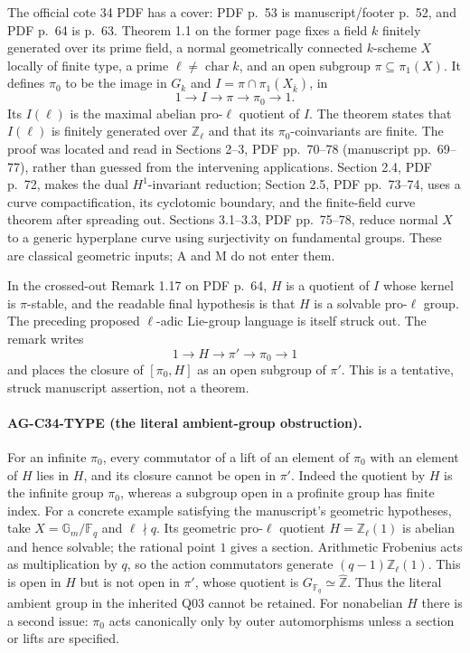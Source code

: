 The official cote 34 PDF has a cover: PDF p.~53 is manuscript/footer
p.~52, and PDF p.~64 is p.~63. Theorem 1.1 on the former page fixes a
field $k$ finitely generated over its prime field, a normal geometrically
connected $k$-scheme $X$ locally of finite type, a prime
$\ell\ne\operatorname{char}k$, and an open subgroup
$\pi\subseteq\pi_1(X)$. It defines $\pi_0$ to be the image in
$G_k$ and $I=\pi\cap\pi_1(X_{\bar k})$, in
\[
 1\longrightarrow I\longrightarrow\pi\longrightarrow\pi_0
 \longrightarrow1.
\]
Its $I(\ell)$ is the maximal abelian pro-$\ell$ quotient of $I$.
The theorem states that $I(\ell)$ is finitely generated over
$\mathbb Z_\ell$ and that its $\pi_0$-coinvariants are finite.
The proof was located and read in Sections 2--3, PDF pp.~70--78
(manuscript pp.~69--77), rather than guessed from the intervening
applications. Section 2.4, PDF p.~72, makes the dual $H^1$-invariant
reduction; Section 2.5, PDF pp.~73--74, uses a curve compactification,
its cyclotomic boundary, and the finite-field curve theorem after
spreading out. Sections 3.1--3.3, PDF pp.~75--78, reduce normal $X$ to
a generic hyperplane curve using surjectivity on fundamental groups.
These are classical geometric inputs; A and M do not enter them.

In the crossed-out Remark 1.17 on PDF p.~64, $H$ is a quotient of $I$
whose kernel is $\pi$-stable, and the readable final hypothesis is that
$H$ is a solvable pro-$\ell$ group. The preceding proposed
$\ell$-adic Lie-group language is itself struck out. The remark writes
\[
 1\longrightarrow H\longrightarrow\pi'\longrightarrow\pi_0
 \longrightarrow1
\]
and places the closure of $[\pi_0,H]$ as an open subgroup of $\pi'$.
This is a tentative, struck manuscript assertion, not a theorem.

\paragraph{AG-C34-TYPE (the literal ambient-group obstruction).}
For an infinite $\pi_0$, every commutator of a lift of an element of
$\pi_0$ with an element of $H$ lies in $H$, and its closure cannot be
open in $\pi'$. Indeed the quotient by $H$ is the infinite group
$\pi_0$, whereas a subgroup open in a profinite group has finite index.
For a concrete example satisfying the manuscript's geometric hypotheses,
take $X=\mathbb G_m/\mathbb F_q$ and $\ell\nmid q$. Its geometric
pro-$\ell$ quotient $H=\mathbb Z_\ell(1)$ is abelian and hence
solvable; the rational point $1$ gives a section. Arithmetic Frobenius
acts as multiplication by $q$, so the action commutators generate
$(q-1)\mathbb Z_\ell(1)$. This is open in $H$ but is not open in
$\pi'$, whose quotient is $G_{\mathbb F_q}\simeq\widehat{\mathbb Z}$.
Thus the literal ambient group in the inherited Q03 cannot be retained.
For nonabelian $H$ there is a second issue: $\pi_0$ acts canonically
only by outer automorphisms unless a section or lifts are specified.

